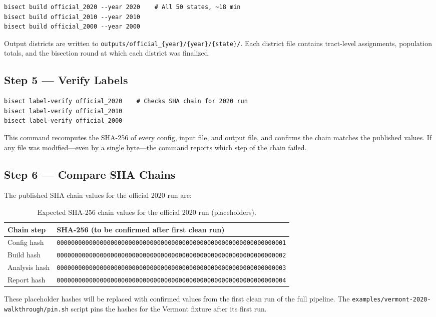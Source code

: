 \begin{verbatim}
bisect build official_2020 --year 2020    # All 50 states, ~18 min
bisect build official_2010 --year 2010
bisect build official_2000 --year 2000
\end{verbatim}

\noindent Output districts are written to
\texttt{outputs/official\_\{year\}/\{year\}/\{state\}/}.
Each district file contains tract-level assignments, population totals,
and the bisection round at which each district was finalized.

\subsection*{Step 5 --- Verify Labels}

\begin{verbatim}
bisect label-verify official_2020    # Checks SHA chain for 2020 run
bisect label-verify official_2010
bisect label-verify official_2000
\end{verbatim}

\noindent This command recomputes the SHA-256 of every config, input file,
and output file, and confirms the chain matches the published values.
If any file was modified---even by a single byte---the command reports
which step of the chain failed.

\subsection*{Step 6 --- Compare SHA Chains}

The published SHA chain values for the official 2020 run are:

\begin{table}[h]
\centering
\caption{Expected SHA-256 chain values for the official 2020 run (placeholders).}
\label{tab:sha}
\begin{tabular}{@{}ll@{}}
\toprule
Chain step & SHA-256 (to be confirmed after first clean run) \\
\midrule
Config hash   & \texttt{0000000000000000000000000000000000000000000000000000000000000001} \\
Build hash    & \texttt{0000000000000000000000000000000000000000000000000000000000000002} \\
Analysis hash & \texttt{0000000000000000000000000000000000000000000000000000000000000003} \\
Report hash   & \texttt{0000000000000000000000000000000000000000000000000000000000000004} \\
\bottomrule
\end{tabular}
\end{table}

\noindent These placeholder hashes will be replaced with confirmed values
from the first clean run of the full pipeline.
The \texttt{examples/vermont-2020-walkthrough/pin.sh} script pins the hashes
for the Vermont fixture after its first run.
